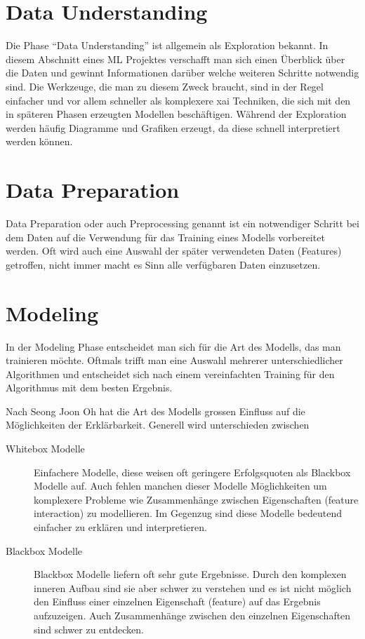 \documentclass[
  12pt, %
  a4paper, %
  oneside, %
  openany, 
  numbers=noenddot, %
  BCOR=5mm, %
  parskip=half*, %
  thesis, %
]{bfhbook}
\begin{document}
\section{Data Understanding}
Die Phase ``Data Understanding'' ist allgemein als Exploration bekannt.
In diesem Abschnitt eines \Gls{ML} Projektes verschafft man sich einen Überblick über die Daten und gewinnt Informationen darüber welche weiteren Schritte notwendig sind. Die Werkzeuge, die man zu diesem Zweck braucht, sind in der Regel einfacher und vor allem schneller als komplexere \Gls{xai} Techniken, die sich mit den in späteren Phasen erzeugten Modellen beschäftigen. Während der Exploration werden häufig Diagramme und Grafiken erzeugt, da diese schnell interpretiert werden können.

\section{Data Preparation}
Data Preparation oder auch Preprocessing genannt ist ein notwendiger Schritt bei dem Daten auf die Verwendung für das Training eines Modells vorbereitet werden. Oft wird auch eine Auswahl der später verwendeten Daten (Features) getroffen, nicht immer macht es Sinn alle verfügbaren Daten einzusetzen.

\section{Modeling}
In der Modeling Phase entscheidet man sich für die Art des Modells, das man trainieren möchte. Oftmals trifft man eine Auswahl mehrerer unterschiedlicher Algorithmen und entscheidet sich nach einem vereinfachten Training für den Algorithmus mit dem besten Ergebnis.

Nach Seong Joon Oh \parencite{Oh2019} hat die Art des Modells grossen Einfluss auf die Möglichkeiten der Erklärbarkeit. Generell wird unterschieden zwischen
\begin{description}
	\item[Whitebox Modelle] Einfachere Modelle, diese weisen oft geringere Erfolgsquoten als Blackbox Modelle auf. Auch fehlen manchen dieser Modelle Möglichkeiten um komplexere Probleme wie Zusammenhänge zwischen Eigenschaften (feature interaction) zu modellieren. Im Gegenzug sind diese Modelle bedeutend einfacher zu erklären und interpretieren.
	\item[Blackbox Modelle] Blackbox Modelle liefern oft sehr gute Ergebnisse. Durch den komplexen inneren Aufbau sind sie aber schwer zu verstehen und es ist nicht möglich den Einfluss einer einzelnen Eigenschaft (feature) auf das Ergebnis aufzuzeigen. Auch Zusammenhänge zwischen den einzelnen Eigenschaften sind schwer zu entdecken.
\end{description}
\end{document}
